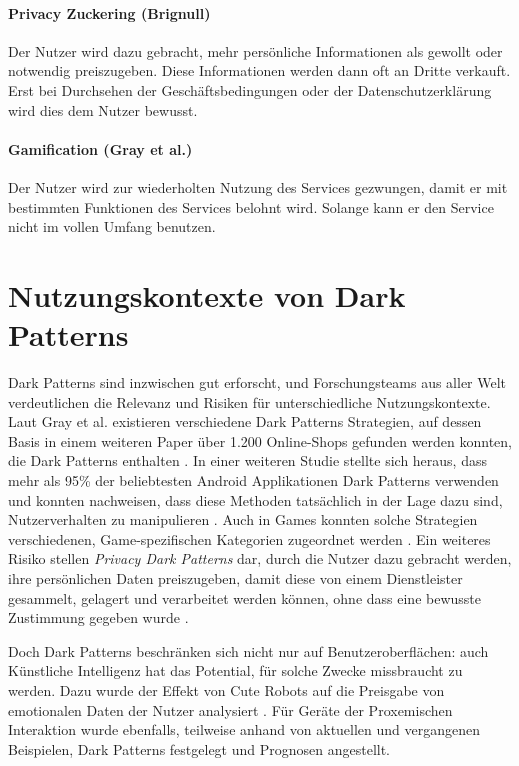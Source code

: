 \documentclass[a4paper]{article}
\begin{document}
\paragraph{Privacy Zuckering (Brignull)}
Der Nutzer wird dazu gebracht, mehr persönliche Informationen als gewollt oder notwendig preiszugeben. Diese Informationen werden dann oft an Dritte verkauft. Erst bei Durchsehen der Geschäftsbedingungen oder der Datenschutzerklärung wird dies dem Nutzer bewusst.

\paragraph{Gamification (Gray et al.)}
Der Nutzer wird zur wiederholten Nutzung des Services gezwungen, damit er mit bestimmten Funktionen des Services belohnt wird. Solange kann er den Service nicht im vollen Umfang benutzen. 


\section{Nutzungskontexte von Dark Patterns} %
\label{sec:nutzungskontexte_von_dark_patterns}
Dark Patterns sind inzwischen gut erforscht, und Forschungsteams aus aller Welt verdeutlichen die Relevanz und Risiken für unterschiedliche Nutzungskontexte. Laut Gray et al. existieren verschiedene Dark Patterns Strategien, auf dessen Basis in einem weiteren Paper über 1.200 Online-Shops gefunden werden konnten, die Dark Patterns enthalten \cite{gray}\cite{mathur}. In einer weiteren Studie stellte sich heraus, dass mehr als 95\% der beliebtesten Android Applikationen Dark Patterns verwenden und konnten nachweisen, dass diese Methoden tatsächlich in der Lage dazu sind, Nutzerverhalten zu manipulieren \cite{geronimo}. Auch in Games konnten solche Strategien verschiedenen, Game-spezifischen Kategorien zugeordnet werden \cite{zagal}. Ein weiteres Risiko stellen \textit{Privacy Dark Patterns} dar, durch die Nutzer dazu gebracht werden, ihre persönlichen Daten preiszugeben, damit diese von einem Dienstleister gesammelt, gelagert und verarbeitet werden können, ohne dass eine bewusste Zustimmung gegeben wurde \cite{boesch}. 

Doch Dark Patterns beschränken sich nicht nur auf Benutzeroberflächen: auch Künstliche Intelligenz hat das Potential, für solche Zwecke missbraucht zu werden. Dazu wurde
der Effekt von \glqq Cute Robots\grqq{} auf die Preisgabe von emotionalen Daten der Nutzer analysiert \cite{lacey}. Für Geräte der Proxemischen Interaktion wurde ebenfalls, teilweise anhand von aktuellen und vergangenen Beispielen, Dark Patterns festgelegt und Prognosen angestellt.
\end{document}

